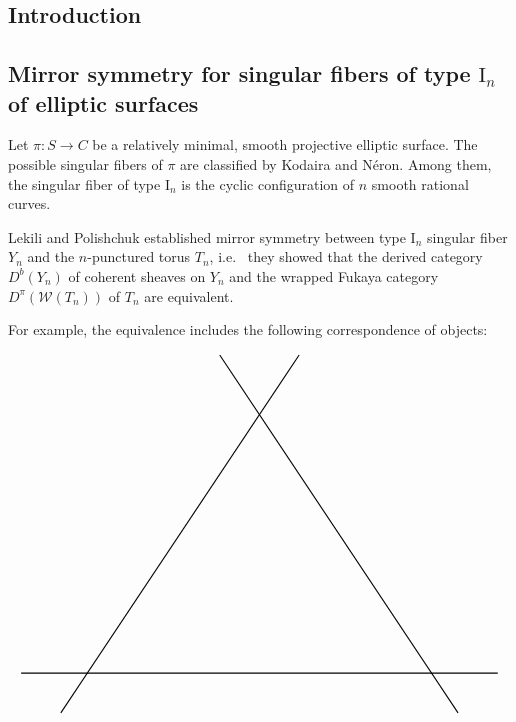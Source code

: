 \documentclass[a0,landscape]{a0poster}
\theoremstyle{plain}
\theoremstyle{definition}
\begin{document}
\large
\begin{multicols}{3} %





    \color{SaddleBrown} %

    \section{Introduction}

    \color{DarkSlateGray} %
    \subsection{Mirror symmetry for singular fibers of type $\textrm{I}_n$ of elliptic surfaces}
    Let $\pi \colon S \to C$ be a relatively minimal, smooth projective elliptic surface.
    The possible singular fibers of $\pi$ are classified by Kodaira and N\'{e}ron.
    Among them, the singular fiber of type $\textrm{I}_n$ is the cyclic configuration of $n$ smooth rational curves.

    Lekili and Polishchuk \cite{MR3663596} established mirror symmetry between type $\textrm{I}_n$ singular fiber $Y_n$ and the $n$-punctured torus $T_n$, i.e.~ they showed that the derived category $D^b(Y_n)$ of coherent sheaves on $Y_n$ and the wrapped Fukaya category $D^\pi(\mathcal{W}(T_n))$ of $T_n$ are equivalent.

    For example, the equivalence includes the following correspondence of objects:
    \begin{center}
        \centering
        \begin{displaymath}
            \begin{tikzpicture}
                \draw[thick] (-9,-1)--(-3,8);
                \draw[thick] (-10,0)--(2,0);
                \draw[thick] (1,-1)--(-5,8);


\end{tikzpicture}
\end{displaymath}
\end{center}
\end{multicols}
\end{document}
